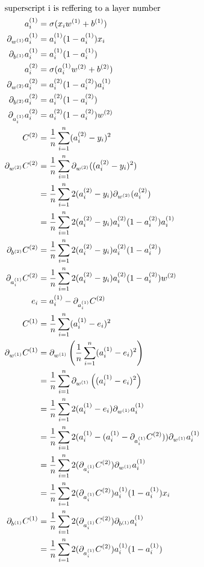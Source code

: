 \documentclass{article}
\begin{document}
\begin{align}
    \shortintertext{superscript i is reffering to a layer number}
    a_i\s[1] &= \sigma(x_iw\s[1] + b\s[1]) \\
    \pd[{w\s[1]}]a_i\s[1] &= a_i\s[1](1 - a_i\s[1])x_i \\
    \pd[{b\s[1]}]a_i\s[1] &= a_i\s[1](1 - a_i\s[1]) \\
    a_i\s[2] &= \sigma(a_i\s[1]w\s[2] + b\s[2]) \\
    \pd[{w\s[2]}]a_i\s[2] &= a_i\s[2](1 - a_i\s[2])a_i\s[1] \\
    \pd[{b\s[2]}]a_i\s[2] &= a_i\s[2](1 - a_i\s[2]) \\
    \pd[{a_i\s[1]}]a_i\s[2] &= a_i\s[2](1 - a_i\s[2])w\s[2] \\
    C\s[2] &= \avgsum[i, n] (a_i\s[2] - y_i)^2 \\
    \pd[{w\s[2]}] C\s[2]
        &= \avgsum[i, n] \pd[{w\s[2]}]((a_i\s[2] - y_i)^2) \\
        &= \avgsum[i, n] 2(a_i\s[2] - y_i)\pd[{w\s[2]}](a_i\s[2]) \\
        &= \avgsum[i, n] 2(a_i\s[2] - y_i)a_i\s[2](1 - a_i\s[2])a_i\s[1] \\
    \pd[{b\s[2]}] C\s[2]
        &= \avgsum[i, n] 2(a_i\s[2] - y_i)a_i\s[2](1 - a_i\s[2]) \\
    \pd[{a_i\s[1]}] C\s[2]
        &= \avgsum[i, n] 2(a_i\s[2] - y_i)a_i\s[2](1 - a_i\s[2])w\s[2] \\
    e_i
        &= a_i\s[1] - \pd[{a_i\s[1]}]C\s[2] \\
    C\s[1]
        &= \avgsum[i, n] (a_i\s[1] - e_i)^2 \\
    \pd[{w\s[1]}]C\s[1]
        &= \pd[{w\s[1]}]\left(\avgsum[i, n] (a_i\s[1] - e_i)^2\right) \\
        &= \avgsum[i, n] \pd[{w\s[1]}]\left((a_i\s[1] - e_i)^2\right) \\
        &= \avgsum[i, n] 2(a_i\s[1] - e_i) \pd[{w\s[1]}]a_i\s[1] \\
        &= \avgsum[i, n] 2(a_i\s[1] -(a_i\s[1] - \pd[{a_i\s[1]}]C\s[2])) \pd[{w\s[1]}]a_i\s[1] \\
        &= \avgsum[i, n] 2(\pd[{a_i\s[1]}]C\s[2]) \pd[{w\s[1]}]a_i\s[1] \\
        &= \avgsum[i, n] 2(\pd[{a_i\s[1]}]C\s[2]) a_i\s[1](1 - a_i\s[1])x_i \\
    \pd[{b\s[1]}]C\s[1]
        &= \avgsum[i, n] 2(\pd[{a_i\s[1]}]C\s[2]) \pd[{b\s[1]}]a_i\s[1] \\
        &= \avgsum[i, n] 2(\pd[{a_i\s[1]}]C\s[2]) a_i\s[1](1 - a_i\s[1])
\end{align}
\end{document}
